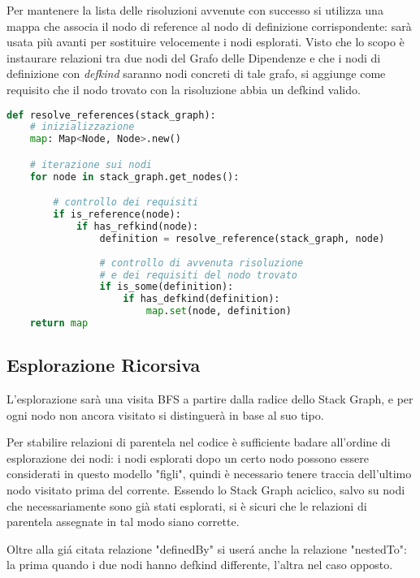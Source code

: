 Per mantenere la lista delle risoluzioni avvenute con successo si utilizza una mappa che associa il nodo di reference al nodo di definizione corrispondente: sar\`a usata pi\`u avanti per sostituire velocemente i nodi esplorati.
Visto che lo scopo \`e instaurare relazioni tra due nodi del Grafo delle Dipendenze e che i nodi di definizione con \emph{defkind} saranno nodi concreti di tale grafo, si aggiunge come requisito che il nodo trovato con la risoluzione abbia un defkind valido.

\begin{lstlisting}[language=Python, caption=pseudocodice]
def resolve_references(stack_graph):
    # inizializzazione
    map: Map<Node, Node>.new()

    # iterazione sui nodi
    for node in stack_graph.get_nodes():

        # controllo dei requisiti
        if is_reference(node):
            if has_refkind(node):
                definition = resolve_reference(stack_graph, node)
                
                # controllo di avvenuta risoluzione
                # e dei requisiti del nodo trovato
                if is_some(definition):
                    if has_defkind(definition):
                        map.set(node, definition)
    return map
\end{lstlisting}

\subsection{Esplorazione Ricorsiva}

L'esplorazione sar\`a una visita BFS a partire dalla radice dello Stack Graph, e per ogni nodo non ancora visitato si distinguer\`a in base al suo tipo.

Per stabilire relazioni di parentela nel codice \`e sufficiente badare all'ordine di esplorazione dei nodi: i nodi esplorati dopo un certo nodo possono essere considerati in questo modello "figli", quindi \`e necessario tenere traccia dell'ultimo nodo visitato prima del corrente. Essendo lo Stack Graph aciclico, salvo su nodi che necessariamente sono gi\`a stati esplorati, si \`e sicuri che le relazioni di parentela assegnate in tal modo siano corrette.

Oltre alla gi\'a citata relazione "definedBy" si user\'a anche la relazione "nestedTo": la prima quando i due nodi hanno defkind differente, l'altra nel caso opposto.

